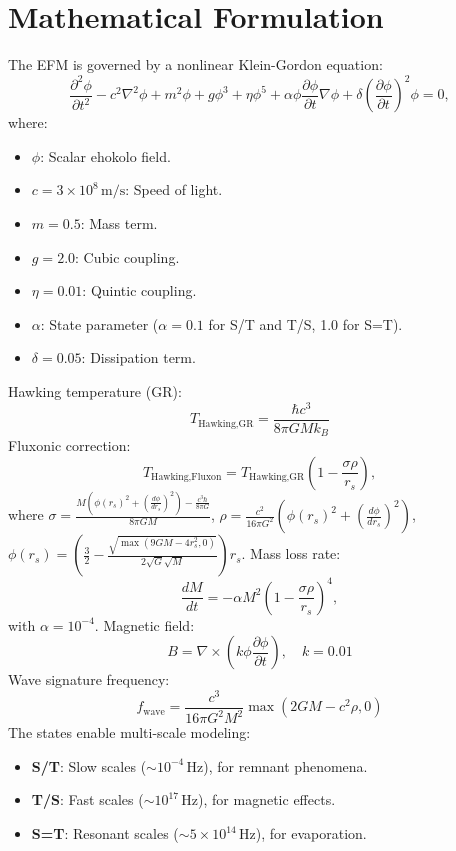 \documentclass[11pt]{article}
\begin{document}
\section{Mathematical Formulation}
The EFM is governed by a nonlinear Klein-Gordon equation:
\begin{equation}
\frac{\partial^2 \phi}{\partial t^2} - c^2 \nabla^2 \phi + m^2 \phi + g \phi^3 + \eta \phi^5 + \alpha \phi \frac{\partial \phi}{\partial t} \nabla \phi + \delta \left(\frac{\partial \phi}{\partial t}\right)^2 \phi = 0,
\end{equation}
where:
\begin{itemize}
    \item \(\phi\): Scalar ehokolo field.
    \item \(c = 3 \times 10^8 \, \text{m/s}\): Speed of light.
    \item \(m = 0.5\): Mass term.
    \item \(g = 2.0\): Cubic coupling.
    \item \(\eta = 0.01\): Quintic coupling.
    \item \(\alpha\): State parameter (\(\alpha = 0.1\) for S/T and T/S, 1.0 for S=T).
    \item \(\delta = 0.05\): Dissipation term.
\end{itemize}
Hawking temperature (GR):
\begin{equation}
T_{\text{Hawking,GR}} = \frac{\hbar c^3}{8 \pi G M k_B}
\end{equation}
Fluxonic correction:
\begin{equation}
T_{\text{Hawking,Fluxon}} = T_{\text{Hawking,GR}} \left( 1 - \frac{\sigma \rho}{r_s} \right),
\end{equation}
where \(\sigma = \frac{M \left( \phi(r_s)^2 + \left( \frac{d\phi}{dr_s} \right)^2 \right) - \frac{c^3 \hbar}{8 \pi G}}{8 \pi G M}\),
\(\rho = \frac{c^2}{16\pi G^2} \left( \phi(r_s)^2 + \left( \frac{d\phi}{dr_s} \right)^2 \right)\),
\(\phi(r_s) = \left( \frac{3}{2} - \frac{\sqrt{\max(9 G M - 4 r_s^2, 0)}}{2 \sqrt{G} \sqrt{M}} \right) r_s\).
Mass loss rate:
\begin{equation}
\frac{dM}{dt} = -\alpha M^2 \left( 1 - \frac{\sigma \rho}{r_s} \right)^4,
\end{equation}
with \(\alpha = 10^{-4}\). Magnetic field:
\begin{equation}
B = \nabla \times \left( k \phi \frac{\partial \phi}{\partial t} \right), \quad k = 0.01
\end{equation}
Wave signature frequency:
\begin{equation}
f_{\text{wave}} = \frac{c^3}{16 \pi G^2 M^2} \max(2 G M - c^2 \rho, 0)
\end{equation}
The states enable multi-scale modeling:
\begin{itemize}
    \item \textbf{S/T}: Slow scales (\(\sim 10^{-4} \, \text{Hz}\)), for remnant phenomena.
    \item \textbf{T/S}: Fast scales (\(\sim 10^{17} \, \text{Hz}\)), for magnetic effects.
    \item \textbf{S=T}: Resonant scales (\(\sim 5 \times 10^{14} \, \text{Hz}\)), for evaporation.
\end{itemize}
\end{document}
